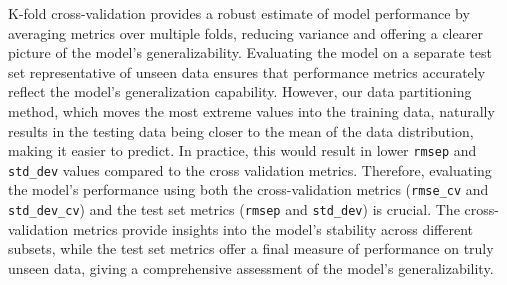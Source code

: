 K-fold cross-validation provides a robust estimate of model performance by averaging metrics over multiple folds, reducing variance and offering a clearer picture of the model's generalizability.
Evaluating the model on a separate test set representative of unseen data ensures that performance metrics accurately reflect the model's generalization capability.
However, our data partitioning method, which moves the most extreme values into the training data, naturally results in the testing data being closer to the mean of the data distribution, making it easier to predict.
In practice, this would result in lower \texttt{rmsep} and \texttt{std\_dev} values compared to the cross validation metrics.
Therefore, evaluating the model's performance using both the cross-validation metrics (\texttt{rmse\_cv} and \texttt{std\_dev\_cv}) and the test set metrics (\texttt{rmsep} and \texttt{std\_dev}) is crucial.
The cross-validation metrics provide insights into the model's stability across different subsets, while the test set metrics offer a final measure of performance on truly unseen data, giving a comprehensive assessment of the model's generalizability.